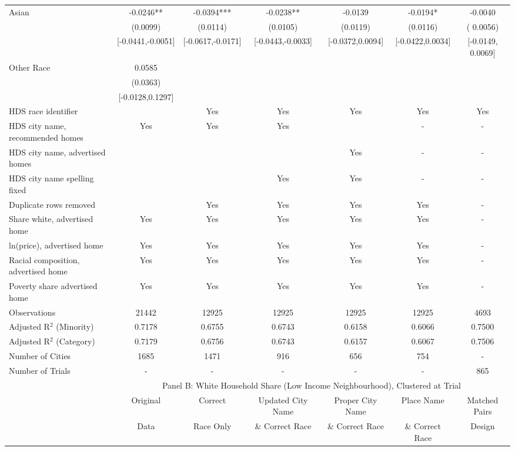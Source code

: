 \begin{table}[htbp]
{\begin{tabular}{l*{6}{c}}
Asian & -0.0246** & -0.0394*** & -0.0238** & -0.0139 & -0.0194* & -0.0040 \\
 & (0.0099) & (0.0114) & (0.0105) & (0.0119) & (0.0116) & ( 0.0056) \\
 & [-0.0441,-0.0051] & [-0.0617,-0.0171] & [-0.0443,-0.0033] & [-0.0372,0.0094] & [-0.0422,0.0034] & [-0.0149,  0.0069] \\
Other Race & 0.0585 &  &  &  &  &  \\
 & (0.0363) &  &  &  &  &  \\
 & [-0.0128,0.1297] &  &  &  &  &  \\
\midrule
HDS race identifier & & Yes & Yes & Yes & Yes & Yes \\
HDS city name, recommended homes & Yes & Yes & Yes & & - & -\\
HDS city name, advertised homes &  &  &  & Yes & - & -\\
HDS city name spelling fixed & & & Yes & Yes & - & -\\
Duplicate rows removed &  & Yes & Yes & Yes & Yes & - \\
\midrule
Share white, advertised home  & Yes & Yes & Yes & Yes & Yes & - \\
ln(price), advertised home  & Yes & Yes & Yes & Yes & Yes & - \\
Racial composition, advertised home & Yes & Yes & Yes & Yes & Yes & - \\
Poverty share advertised home & Yes & Yes & Yes & Yes & Yes & - \\
Observations & 21442 & 12925 & 12925 & 12925 & 12925 & 4693 \\
Adjusted R$^2$ (Minority) & 0.7178 & 0.6755 & 0.6743 & 0.6158 & 0.6066 & 0.7500 \\
Adjusted R$^2$ (Category) & 0.7179 & 0.6756 & 0.6743 & 0.6157 & 0.6067 & 0.7506 \\
Number of Cities & 1685 & 1471 & 916 & 656 & 754 & - \\
Number of Trials & - & - & - & - & - & 865 \\
\bottomrule
\toprule
& \multicolumn{6}{c}{Panel B: White Household Share (Low Income Neighbourhood), Clustered at Trial}\\
\toprule
                    &\multicolumn{1}{c}{Original}&\multicolumn{1}{c}{Correct}&\multicolumn{1}{c}{Updated City Name}&\multicolumn{1}{c}{Proper City Name}&\multicolumn{1}{c}{Place Name}&\multicolumn{1}{c}{Matched Pairs}\\
                      &\multicolumn{1}{c}{Data}&\multicolumn{1}{c}{Race Only}&\multicolumn{1}{c}{\& Correct Race}&\multicolumn{1}{c}{\& Correct Race}&\multicolumn{1}{c}{\& Correct Race}&\multicolumn{1}{c}{Design}\\                  

\end{tabular}}
\end{table}
